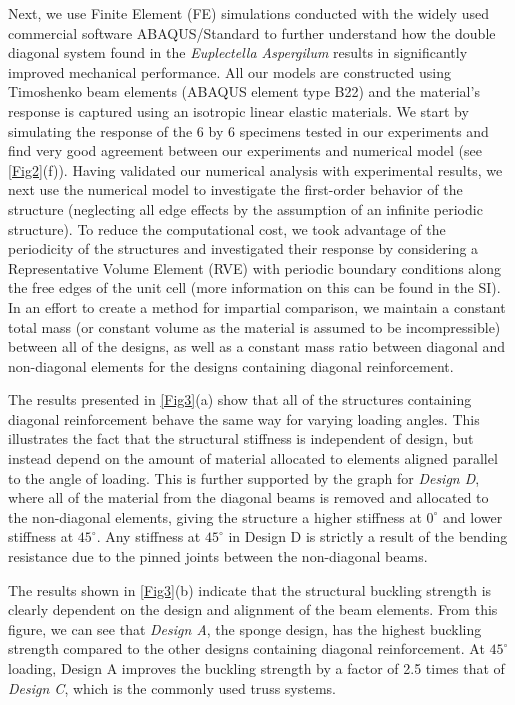 \documentclass[9pt,twocolumn,twoside]{fernandes_paper}
\begin{document}
Next, we use Finite Element (FE) simulations conducted with the widely used commercial software ABAQUS/Standard to further understand how the double diagonal system found in the \textit{Euplectella Aspergilum} results in significantly improved mechanical performance. All our models are constructed using Timoshenko beam elements (ABAQUS element type B22) and the material's response is captured using an isotropic linear elastic materials. We start by simulating the response of the 6 by 6 specimens tested in our experiments and find very good agreement between our experiments and numerical model (see \cref{Fig2}(f)). Having validated our numerical analysis with experimental results, we next use the numerical model to investigate the first-order behavior of the structure (neglecting all edge effects by the assumption of an infinite periodic structure). To reduce the computational cost, we took advantage of the periodicity of the structures and investigated their response by considering a Representative Volume Element (RVE) with periodic boundary conditions along the free edges of the unit cell (more information on this can be found in the SI). In an effort to create a method for impartial comparison, we maintain a constant total mass (or constant volume as the material is assumed to be incompressible) between all of the designs, as well as a constant mass ratio between diagonal and non-diagonal elements for the designs containing diagonal reinforcement. 

The results presented in \cref{Fig3}(a) show that all of the structures containing diagonal reinforcement behave the same way for varying loading angles. This illustrates the fact that the structural stiffness is independent of design, but instead depend on the amount of material allocated to elements aligned parallel to the angle of loading. This is further supported by the graph for \emph{Design D}, where all of the material from the diagonal beams is removed and allocated to the non-diagonal elements, giving the structure a higher stiffness at $0^\circ$ and lower stiffness at $45^\circ$. Any stiffness at $45^\circ$ in Design D is strictly a result of the bending resistance due to the pinned joints between the non-diagonal beams.

The results shown in \cref{Fig3}(b) indicate that the structural buckling strength is clearly dependent on the design and alignment of the beam elements. From this figure, we can see that \emph{Design A}, the sponge design, has the highest buckling strength compared to the other designs containing diagonal reinforcement. At $45^\circ$ loading, Design A improves the buckling strength by a factor of 2.5 times that of \emph{Design C}, which is the commonly used truss systems. 
\end{document}
